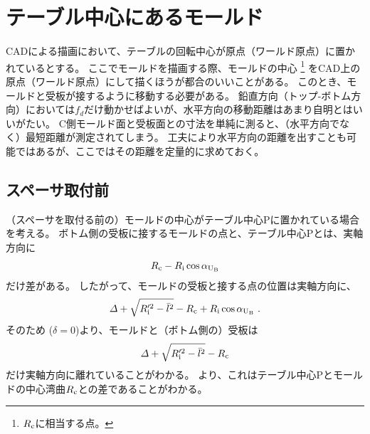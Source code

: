 \section{テーブル中心にあるモールド}
CADによる描画において、テーブルの回転中心が原点（ワールド原点）に置かれているとする。
ここでモールドを描画する際、モールドの中心
\footnote{$R_\text c$に相当する点。}\relax
をCAD上の原点（ワールド原点）にして描くほうが都合のいいことがある。
このとき、モールドと受板が接するように移動する必要がある。
鉛直方向（トップ-ボトム方向）においては$f_d$だけ動かせばよいが、水平方向の移動距離はあまり自明とはいいがたい。
C側モールド面と受板面との寸法を単純に測ると、（水平方向でなく）最短距離が測定されてしまう。
工夫により水平方向の距離を出すことも可能ではあるが、ここではその距離を定量的に求めておく。



\subsection{スペーサ取付前}
（スペーサを取付る前の）モールドの中心がテーブル中心Pに置かれている場合を考える。
ボトム側の受板に接するモールドの点と、テーブル中心Pとは、実軸方向に
\begin{align*}
  R_\text c-R_\text i\cos\alpha_{\text U_\text B}
\end{align*}
だけ差がある。
したがって、モールドの受板と接する点の位置は実軸方向に、
\begin{align*}
  \varDelta+\sqrt{R_\text i'^2-\bar l^2}-R_\text c+R_\text i\cos\alpha_{\text U_\text B}\ .
\end{align*}
そのため ($\delta = 0$)より、モールドと（ボトム側の）受板は
\begin{align*}
  \varDelta+\sqrt{R_\text i'^2-\bar l^2}-R_\text c
\end{align*}
だけ実軸方向に離れていることがわかる。
より、これはテーブル中心Pとモールドの中心湾曲$R_\text c$との差であることがわかる。



